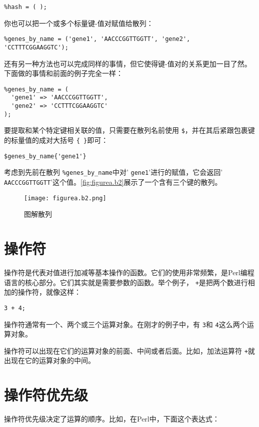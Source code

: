 \begin{lstlisting}
%hash = ( );
\end{lstlisting}

你也可以把一个或多个标量键-值对赋值给散列：

\begin{lstlisting}
%genes_by_name = ('gene1', 'AACCCGGTTGGTT', 'gene2', 'CCTTTCGGAAGGTC');
\end{lstlisting}

还有另一种方法也可以完成同样的事情，但它使得键-值对的关系更加一目了然。下面做的事情和前面的例子完全一样：

\begin{lstlisting}
%genes_by_name = (
  'gene1' => 'AACCCGGTTGGTT',
  'gene2' => 'CCTTTCGGAAGGTC'
);
\end{lstlisting}

要提取和某个特定键相关联的值，只需要在散列名前使用 \verb|$|，并在其后紧跟包裹键的标量值的成对大括号 \verb|{ }|即可：

\begin{lstlisting}
$genes_by_name{'gene1'}
\end{lstlisting}

考虑到先前在散列 \verb|%genes_by_name|中对' \verb|gene1|'进行的赋值，它会返回' \verb|AACCCGGTTGGTT|'这个值。\autoref{fig:figurea.b2}展示了一个含有三个键的散列。

\begin{figure}
  \centering
  \texttt{[image: figurea.b2.png]}
  \caption{图解散列}
  \label{fig:figurea.b2}
 \end{figure}{}

\section{操作符}
操作符是代表对值进行加减等基本操作的函数。它们的使用非常频繁，是Perl编程语言的核心部分。它们其实就是需要参数的函数。举个例子， \verb|+|是把两个数进行相加的操作符，就像这样：

\begin{lstlisting}
3 + 4;
\end{lstlisting}

操作符通常有一个、两个或三个运算对象。在刚才的例子中，有 \verb|3|和 \verb|4|这么两个运算对象。

操作符可以出现在它们的运算对象的前面、中间或者后面。比如，加法运算符 \verb|+|就出现在它的运算对象的中间。

\section{操作符优先级}
操作符优先级决定了运算的顺序。比如，在Perl中，下面这个表达式：

